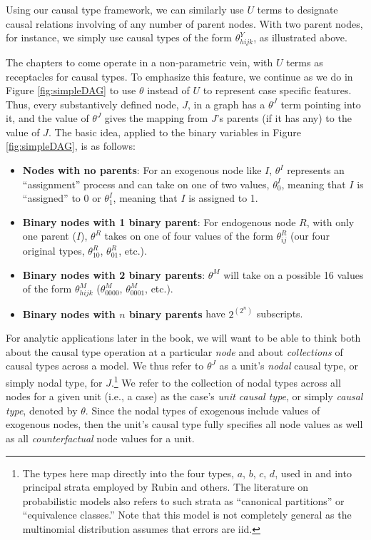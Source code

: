 \documentclass[
  12pt,
]{book}
\providecommand{\tightlist}{%
  \setlength{\itemsep}{0pt}\setlength{\parskip}{0pt}}
\begin{document}
Using our causal type framework, we can similarly use \(U\) terms to designate causal relations involving of any number of parent nodes. With two parent nodes, for instance, we simply use causal types of the form \(\theta^Y_{hijk}\), as illustrated above.

The chapters to come operate in a non-parametric vein, with \(U\) terms as receptacles for causal types. To emphasize this feature, we continue as we do in Figure \ref{fig:simpleDAG} to use \(\theta\) instead of \(U\) to represent case specific features. Thus, every substantively defined node, \(J\), in a graph has a \(\theta^J\) term pointing into it, and the value of \(\theta^J\) gives the mapping from \(J\)'s parents (if it has any) to the value of \(J\). The basic idea, applied to the binary variables in Figure \ref{fig:simpleDAG}, is as follows:

\begin{itemize}
\tightlist
\item
  \textbf{Nodes with no parents}: For an exogenous node like \(I\), \(\theta^I\) represents an ``assignment'' process and can take on one of two values, \(\theta^I_{0}\), meaning that \(I\) is ``assigned'' to \(0\) or \(\theta^I_{1}\), meaning that \(I\) is assigned to 1.
\item
  \textbf{Binary nodes with 1 binary parent}: For endogenous node \(R\), with only one parent (\(I\)), \(\theta^R\) takes on one of four values of the form \(\theta^R_{ij}\) (our four original types, \(\theta^R_{10}\), \(\theta^R_{01}\), etc.).
\item
  \textbf{Binary nodes with 2 binary parents}: \(\theta^M\) will take on a possible 16 values of the form \(\theta^M_{hijk}\) (\(\theta^M_{0000}\), \(\theta^M_{0001}\), etc.).
\item
  \textbf{Binary nodes with \(n\) binary parents} have \(2^{\left(2^n\right)}\) subscripts.
\end{itemize}

For analytic applications later in the book, we will want to be able to think both about the causal type operation at a particular \emph{node} and about \emph{collections} of causal types across a model. We thus refer to \(\theta^J\) as a unit's \emph{nodal} causal type, or simply nodal type, for \(J\).\footnote{The types here map directly into the four types, \(a\), \(b\), \(c\), \(d\), used in \citet{humphreys2015mixing} and into principal strata employed by Rubin and others. The literature on probabilistic models also refers to such strata as ``canonical partitions'' or ``equivalence classes.'' Note that this model is not completely general as the multinomial distribution assumes that errors are iid.} We refer to the collection of nodal types across all nodes for a given unit (i.e., a case) as the case's \emph{unit causal type}, or simply \emph{causal type}, denoted by \(\theta\). Since the nodal types of exogenous include values of exogenous nodes, then the unit's causal type fully specifies all node values as well as all \emph{counterfactual} node values for a unit.
\end{document}
